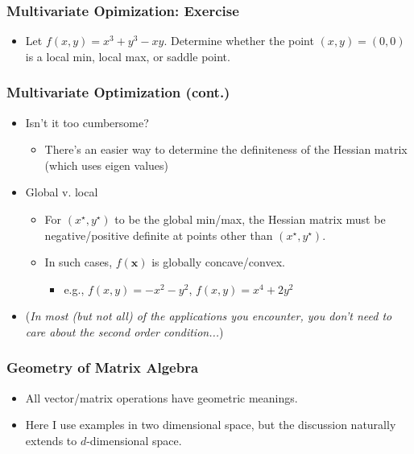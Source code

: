 \documentclass[pdflatex, 12pt]{beamer}
\begin{document}
\begin{frame}
\frametitle{Multivariate Opimization: Exercise}
\begin{itemize}
\item Let $f(x, y) = x^3 + y^3 - xy$. Determine whether the point $(x, y) = (0, 0)$ is a local min, local max, or saddle point. 
\end{itemize}
\end{frame}

\begin{frame}
\frametitle{Multivariate Optimization (cont.)}
\begin{itemize}
\item Isn't it too cumbersome?
 \begin{itemize}
 \item There's an easier way to determine the definiteness of the Hessian matrix (which uses eigen values)
 \end{itemize}
\vspace{0.4cm}
\item Global v. local
 \begin{itemize}
 \item For $(x^{\star}, y^{\star})$ to be the global min/max, the Hessian matrix must be negative/positive definite at points other than $(x^{\star}, y^{\star})$.
 \item In such cases, $f(\bm{x})$ is globally concave/convex. 
  \begin{itemize}
  \item e.g., $f(x, y) = -x^2 - y^2$, $f(x, y) = x^4 + 2y^2$
  \end{itemize}
 \end{itemize}
\vspace{0.4cm}
\item (\emph{In most (but not all) of the applications you encounter, you don't need to care about the second order condition...})
\end{itemize}
\end{frame}

\begin{frame}
\frametitle{Geometry of Matrix Algebra}
\begin{itemize}
\item All vector/matrix operations have geometric meanings.
\vspace{0.4cm}
\item Here I use examples in two dimensional space, but the discussion naturally extends to $d$-dimensional space. 
\end{itemize}
\end{frame}
\end{document}
